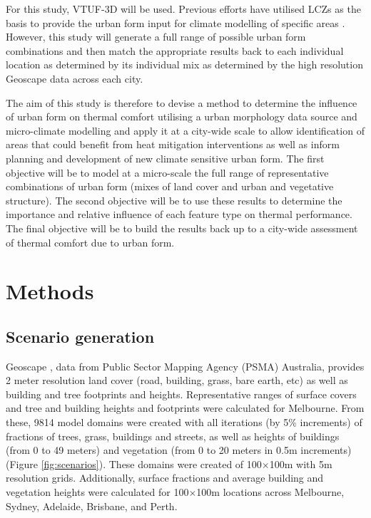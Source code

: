 \documentclass[final,3p,times,authoryear]{elsarticle}
\begin{document}
For this study, VTUF-3D will be used. Previous efforts have utilised LCZs as the basis to provide the urban form input for climate modelling of specific areas \citep{stewart2014eval,Verdonck2018,Hammerberg2018,Masson2020,Emery2021}. However, this study will generate a full range of possible urban form combinations and then match the appropriate results back to each individual location as determined by its individual mix as determined by the high resolution Geoscape data across each city. 

The aim of this study is therefore to devise a method to determine the influence of urban form on thermal comfort utilising a urban morphology data source and micro-climate modelling and apply it at a city-wide scale to allow identification of areas that could benefit from heat mitigation interventions as well as inform planning and development of new climate sensitive urban form. The first objective will be to model at a micro-scale the full range of representative combinations of urban form (mixes of land cover and urban and vegetative structure). The second objective will be to use these results to determine the importance and relative influence of each feature type on thermal performance. The final objective will be to build the results back up to a city-wide assessment of thermal comfort due to urban form.






\section{Methods}\label{sec:methods}



\subsection{Scenario generation}\label{sec:methodsgen}
Geoscape \citep{Geoscape2020}, data from Public Sector Mapping Agency (PSMA) Australia, provides 2 meter resolution land cover (road, building, grass, bare earth, etc) as well as building and tree footprints and heights. Representative ranges of surface covers and tree and building heights and footprints were calculated for Melbourne. From these, 9814 model domains were created with all iterations (by 5\% increments) of fractions of trees, grass, buildings and streets, as well as heights of buildings (from 0 to 49 meters) and vegetation (from 0 to 20 meters in 0.5m increments) (Figure \ref{fig:scenarios}). These domains were created of 100$\times$100m with 5m resolution grids. Additionally, surface fractions and average building and vegetation heights were calculated for 100$\times$100m locations across Melbourne, Sydney, Adelaide, Brisbane, and Perth.
\end{document}
